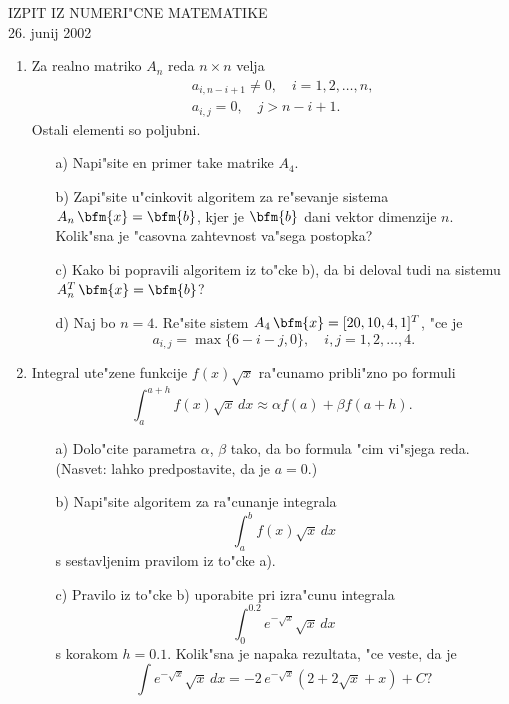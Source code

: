 
{\large \begin{center}
  IZPIT IZ NUMERI"CNE MATEMATIKE\\
  26. junij 2002
\end{center}

\begin{enumerate}

  \item Za realno matriko $A_n$ reda $n\times n$ velja
    \begin{eqnarray*}
      &&a_{i,n-i+1}\neq 0, \quad i=1,2,\dots,n,\\
      &&a_{i,j}=0, \quad j>n-i+1.
    \end{eqnarray*}
    Ostali elementi so poljubni.
    \begin{itemize}
      \item[a)] Napi"site en primer take matrike $A_4$.
      \item[b)] Zapi"site u"cinkovit algoritem za re"sevanje sistema
        $A_n\,\bfm{x}=\bfm{b}$, kjer je $\bfm{b}$ dani vektor dimenzije $n$.
        Kolik"sna je "casovna zahtevnost va"sega postopka?
      \item[c)] Kako bi popravili algoritem iz to"cke b), da bi deloval
        tudi na sistemu $A_n^T\,\bfm{x}=\bfm{b}$?
      \item[d)] Naj bo $n=4$. Re"site sistem $A_4\,\bfm{x}=[20,10,4,1]^T$, 
        "ce je
        $$a_{i,j}=\max\{6-i-j,0\},\quad i,j=1,2,\dots,4.$$
    \end{itemize}

  \item Integral ute"zene funkcije $f(x)\sqrt{x}$ ra"cunamo pribli"zno
    po formuli
    $$\int_{a}^{a+h} f(x)\sqrt{x}\,dx\approx \alpha f(a)+\beta f(a+h).$$
    \begin{itemize}
      \item[a)] Dolo"cite parametra $\alpha$, $\beta$ tako, da bo
      formula "cim vi"sjega reda. (Nasvet: lahko predpostavite, da je $a=0$.)
      \item[b)] Napi"site algoritem za ra"cunanje integrala
        $$\int_{a}^b f(x)\sqrt{x}\,dx$$
        s sestavljenim pravilom iz to"cke a).
      \item[c)] Pravilo iz to"cke b) uporabite pri izra"cunu integrala
        $$\int_0^{0.2}e^{-\sqrt{x}}\sqrt{x}\,dx$$
        s korakom $h=0.1$.
        Kolik"sna je napaka rezultata, "ce veste, da je
        $$\int e^{-\sqrt{x}}\sqrt{x}\,dx=
        -2\,e^{-\sqrt{x}}(2+2\sqrt{x}+x)+C?$$
     \end{itemize}
\end{enumerate}

}
